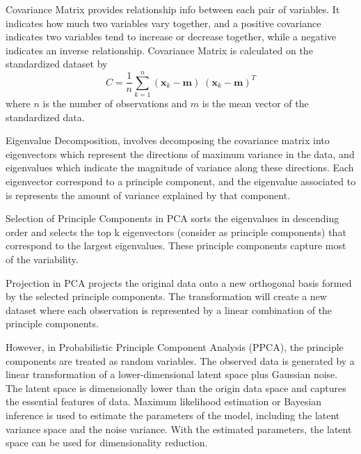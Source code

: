 \documentclass[12pt,a4paper,english
]{tunithesis}
\begin{document}
Covariance Matrix provides relationship info between each pair of variables. It indicates how much two variables vary together, and a positive covariance indicates two variables tend to increase or decrease together, while a negative indicates an inverse relationship. Covariance Matrix is calculated on the standardized dataset by 
\begin{equation*}
    C = \frac{1}{n}\sum\limits_{k=1}^n (\pmb x_k - \pmb m)\;(\pmb x_k - \pmb m)^T
\end{equation*}
where $n$ is the number of observations and $m$ is the mean vector of the standardized data.

Eigenvalue Decomposition, involves decomposing the covariance matrix into eigenvectors which represent the directions of maximum variance in the data, and eigenvalues which indicate the magnitude of variance along these directions. Each eigenvector correspond to a principle component, and the eigenvalue associated to is represents the amount of variance explained by that component. 

Selection of Principle Components in PCA sorts the eigenvalues in descending order and selects the top k eigenvectors (consider as principle components) that correspond to the largest eigenvalues. These principle components capture most of the variability.

Projection in PCA projects the original data onto a new orthogonal basis formed by the selected principle components. The transformation will create a new dataset where each observation is represented by a linear combination of the principle components.

However, in Probabilistic Principle Component Analysis (PPCA), the principle components are treated as random variables. The observed data is generated by a linear transformation of a lower-dimensional latent space plus Gaussian noise. The latent space is dimensionally lower than the origin data space and captures the essential features of data. Maximum likelihood estimation or Bayesian inference is used to estimate the parameters of the model, including the latent variance space and the noise variance. With the estimated parameters, the latent space can be used for dimensionality reduction. 
\end{document}
